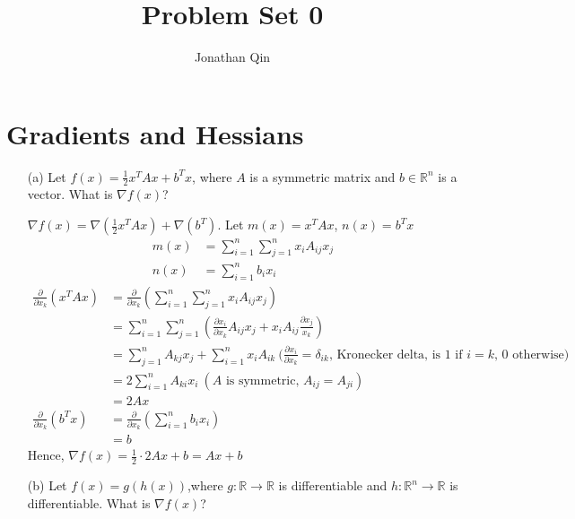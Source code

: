 \documentclass[11pt]{article}
\title{\bf{Problem Set 0}}
\author{Jonathan Qin}
\newcommand{\R}{\mathbb{R}}
\begin{document}
\maketitle


\section{Gradients and Hessians}
\begin{enumerate}


\item[(a)]
Let $f(x) = \frac{1}{2}x^{T}Ax + b^{T}x$, where $A$ is a symmetric matrix and $b \in \R^{n}$ is a vector. What is $\nabla f(x)$?

\color{blue}
$\nabla f(x) = \nabla(\frac{1}{2}x^{T}Ax) + \nabla (b^{T}).$
Let $m(x) = x^{T}Ax$, $n(x) = b^{T}x$
\begin{equation*}
\begin{aligned}
		m(x) &= \sum_{i=1}^n \sum_{j=1}^n x_{i}A_{ij}x_{j}\\
		n(x) &= \sum_{i=1}^n b_i x_i
\end{aligned}
\end{equation*}
\begin{equation*}
\begin{aligned}
	\frac{\partial}{\partial x_{k}} (x^{T}Ax) &= \frac{\partial}{\partial x_{k}} (\sum_{i=1}^n \sum_{j=1}^n x_{i}A_{ij}x_{j}) \\
     &= \sum_{i=1}^n \sum_{j=1}^n (\frac{\partial x_{i}}{\partial x_{k}}A_{ij}x_{j} + x_{i}A_{ij} \frac{\partial x_{j}}{x_{k}}) \\
     &= \sum_{j=1}^n A_{kj}{x_j} + \sum_{i=1}^n x_{i}A_{ik} \: (\frac{\partial x_i}{\partial x_k} = \delta_{ik} \text{,  Kronecker delta, is 1 if $i = k$, 0 otherwise)} \\
     &= 2 \sum_{i = 1}^n A_{ki}{x_i} \: (A \text { is symmetric, } A_{ij} = A_{ji}) \\
     &= 2 Ax \\
	\frac{\partial} {\partial x_k}(b^{T}x) &= \frac{\partial} {\partial x_k} (\sum_{i=1}^n b_i x_i) \\
	&= b
\end{aligned}
\end{equation*}
Hence, $\nabla f(x) = \frac{1}{2} \cdot 2Ax + b = Ax+b$
\color{black}

\item[(b)]
Let $f(x) = g(h(x))$,where $g:\R \rightarrow \R$ is differentiable and $h: \R ^{n} \rightarrow \R$ is differentiable. What is $\nabla f(x)$?


\end{enumerate}
\end{document}
